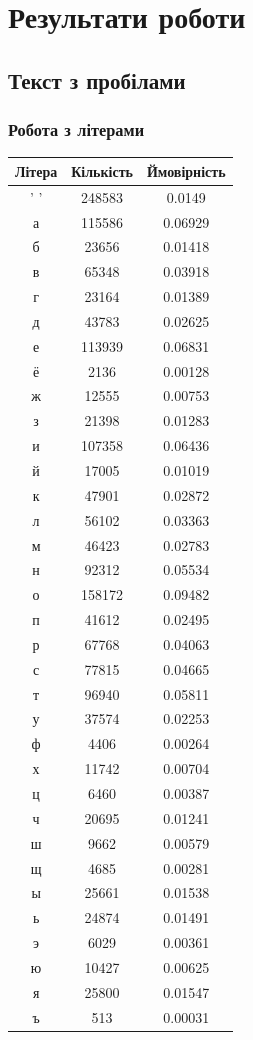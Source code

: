 \documentclass[12pt]{article}
\begin{document}
\newpage
\section{Результати роботи}
\subsection{Текст з пробілами}
\subsubsection{Робота з літерами}
\begin{table}[htbp]
\centering
\begin{tabular}{|c|c|c|}
\hline
Літера & Кількість & Ймовірність \\ \hline
' ' & 248583 & 0.0149 \\
а & 115586 & 0.06929 \\
б & 23656 & 0.01418 \\
в & 65348 & 0.03918 \\
г & 23164 & 0.01389 \\
д & 43783 & 0.02625 \\
е & 113939 & 0.06831 \\
ё & 2136 & 0.00128 \\
ж & 12555 & 0.00753 \\
з & 21398 & 0.01283 \\
и & 107358 & 0.06436 \\
й & 17005 & 0.01019 \\
к & 47901 & 0.02872 \\
л & 56102 & 0.03363 \\
м & 46423 & 0.02783 \\
н & 92312 & 0.05534 \\
о & 158172 & 0.09482 \\
п & 41612 & 0.02495 \\
р & 67768 & 0.04063 \\
с & 77815 & 0.04665 \\
т & 96940 & 0.05811 \\
у & 37574 & 0.02253 \\
ф & 4406 & 0.00264 \\
х & 11742 & 0.00704 \\
ц & 6460 & 0.00387 \\
ч & 20695 & 0.01241 \\
ш & 9662 & 0.00579 \\
щ & 4685 & 0.00281 \\
ы & 25661 & 0.01538 \\
ь & 24874 & 0.01491 \\
э & 6029 & 0.00361 \\
ю & 10427 & 0.00625 \\
я & 25800 & 0.01547 \\
ъ & 513 & 0.00031 \\ \hline
\end{tabular}
\label{tab:letter-results}
\end{table}
\end{document}
